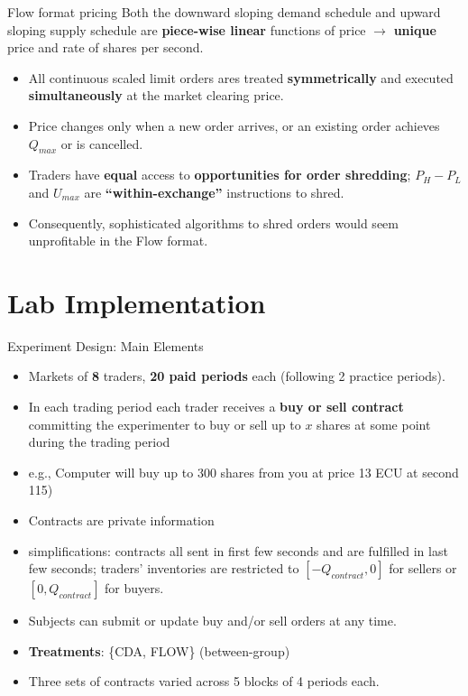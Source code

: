 \documentclass[10pt]{beamer}
\begin{document}
\begin{frame}{Flow format pricing}
Both the downward sloping demand schedule and upward sloping supply schedule are \textbf{piece-wise linear} functions of price $\rightarrow$ \textbf{unique} price and rate of shares per second. %
\begin{itemize}
\item All continuous scaled limit orders ares treated \textbf{symmetrically} and executed \textbf{simultaneously} at the market clearing price. %
\item Price changes only when a new order arrives, or an existing order achieves $Q_{max}$ or is cancelled.
\item Traders have \textbf{equal} access to \textbf{opportunities for order shredding}; $P_H - P_L$ and $U_{max}$ are  \textbf{``within-exchange''}
instructions to shred. %
\item Consequently, sophisticated algorithms to shred orders would seem unprofitable in the Flow format.
    \end{itemize} %
\end{frame}

\section{Lab Implementation}

\begin{frame}{Experiment Design: Main Elements}
    \begin{itemize}
        \item Markets of \textbf{8} traders, \textbf{20 paid periods} each (following 2 practice periods). %
        \item In each trading period each trader receives a \textbf{buy or sell contract} committing the experimenter to buy or sell up to $x$ shares at some point during the trading period 
        \item e.g., Computer will buy up to 300 shares from you at price 13 ECU at second 115) 
        \item Contracts are private information %
        \item simplifications: contracts all sent in first few seconds and are fulfilled in last few seconds; traders' inventories are restricted to $[-Q_{contract}, 0]$ for sellers or $[0, Q_{contract}]$ for buyers.
        \item Subjects can submit or update buy and/or sell orders at any time. %
        \item \textbf{Treatments}: \{CDA, FLOW\} (between-group)
        \item Three sets of contracts varied across 5 blocks of 4 periods each. 
    \end{itemize}
\end{frame}
\end{document}
